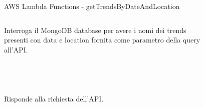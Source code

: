 \documentclass[xcolor=svgnames, aspectratio=169]{beamer}
\begin{document}
\begin{frame}{AWS Lambda Functions - getTrendsByDateAndLocation}
    \begin{columns}[t]
        Interroga il MongoDB database per avere i nomi dei trends presenti con data e location fornita come parametro della query all'API.\\~\\~\\~\\~\\
        
        Risponde alla richiesta dell'API.
        
        \vspace*{-32pt}
        \begin{figure}[H]
            \centering
            \noindent{}
        \end{figure}
    \end{columns}
\end{frame}
\end{document}
